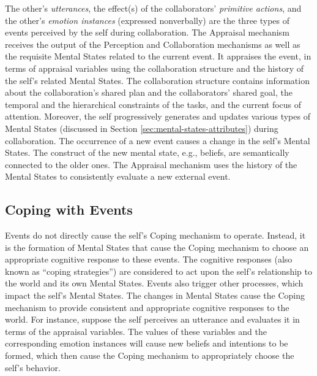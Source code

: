 \documentclass[12pt]{report}
\begin{document}
The other's \textit{utterances}, the effect(s) of the collaborators'
\textit{primitive actions}, and the other's \textit{emotion instances}
(expressed nonverbally) are the three types of events perceived by the self
during collaboration. The Appraisal mechanism receives the output of the
Perception and Collaboration mechanisms as well as the requisite Mental States
related to the current event. It appraises the event, in terms of appraisal
variables using the collaboration structure and the history of the self's
related Mental States. The collaboration structure contains information about
the collaboration's shared plan and the collaborators' shared goal, the temporal
and the hierarchical constraints of the tasks, and the current focus of
attention. Moreover, the self progressively generates and updates various types
of Mental States (discussed in Section \ref{sec:mental-states-attributes})
during collaboration. The occurrence of a new event causes a change in the
self's Mental States. The construct of the new mental state, e.g., beliefs, are
semantically connected to the older ones. The Appraisal mechanism uses the
history of the Mental States to consistently evaluate a new external event.

\subsection{Coping with Events}

Events do not directly cause the self's Coping mechanism to operate. Instead, it
is the formation of Mental States that cause the Coping mechanism to choose an
appropriate cognitive response to these events. The cognitive responses (also
known as ``coping strategies'') are considered to act upon the self's
relationship to the world and its own Mental States. Events also trigger other
processes, which impact the self's Mental States. The changes in Mental States
cause the Coping mechanism to provide consistent and appropriate cognitive
responses to the world. For instance, suppose the self perceives an utterance
and evaluates it in terms of the appraisal variables. The values of these
variables and the corresponding emotion instances will cause new beliefs and
intentions to be formed, which then cause the Coping mechanism to appropriately
choose the self's behavior.
\end{document}
